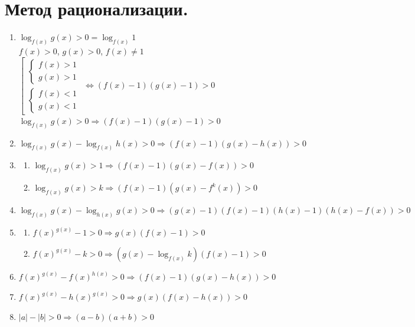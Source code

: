 \documentclass[12pt]{article}
\begin{document}
	\section{Метод рационализации.}
	\begin{enumerate}
		\item $\log_{f(x)}g(x) > 0 = \log_{f(x)}1$\\
		$f(x) > 0$, $g(x) > 0$, $f(x) \not= 1$\\
		$\left[ \begin{gathered}
			\begin{cases}
				f(x) > 1\\
				g(x) > 1
			\end{cases}\\
			\begin{cases}
				f(x) < 1\\
				g(x) < 1
			\end{cases}
		\end{gathered} \right. \Leftrightarrow (f(x) - 1)(g(x) - 1) > 0$\\
		$\log_{f(x)}g(x) > 0 \Rightarrow (f(x) - 1)(g(x) - 1) > 0$
		\item $\log_{f(x)}g(x) - \log_{f(x)}h(x) > 0 \Rightarrow (f(x) - 1)(g(x) - h(x)) > 0$
		\item \begin{enumerate}
			\item $\log_{f(x)}g(x) > 1 \Rightarrow (f(x) - 1)(g(x) - f(x)) > 0$
			\item $\log_{f(x)}g(x) > k \Rightarrow (f(x) - 1)(g(x) - f^k(x)) > 0$
		\end{enumerate}
		\item $\log_{f(x)}g(x) - \log_{h(x)}g(x) > 0 \Rightarrow (g(x) - 1)(f(x) - 1)(h(x) - 1)(h(x) - f(x)) > 0$
		\item \begin{enumerate}
			\item $f(x)^{g(x)} - 1 > 0 \Rightarrow g(x)(f(x) - 1) > 0$
			\item $f(x)^{g(x)} - k > 0 \Rightarrow (g(x) - \log_{f(x)}k)(f(x) - 1) > 0$
		\end{enumerate}
		\item $f(x)^{g(x)} - f(x)^{h(x)} > 0 \Rightarrow (f(x) - 1)(g(x) - h(x)) > 0$
		\item $f(x)^{g(x)} - h(x)^{g(x)} > 0 \Rightarrow g(x)(f(x) - h(x)) > 0$
		\item $|a| - |b| > 0 \Rightarrow (a - b)(a + b) > 0$
	\end{enumerate}
	
\end{document}
